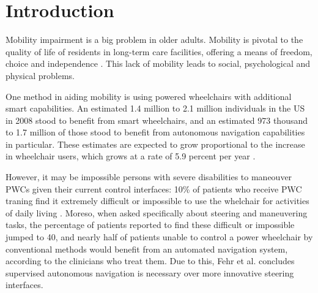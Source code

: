 

\chapter{Introduction}
\label{ch:Introduction}







Mobility impairment is a big problem in older adults. Mobility is pivotal to the
quality of life of residents in long-term care facilities, offering a means of
freedom, choice and independence \cite{bourret2002meaning}.
This lack of mobility leads to social, psychological and physical problems.

One method in aiding mobility is using powered wheelchairs with additional smart
capabilities.
An estimated 1.4 million to 2.1 million individuals in the US in 2008 stood to
benefit from smart wheelchairs, and an estimated 973 thousand to 1.7 million of
those stood to benefit from autonomous navigation capabilities in particular.
These estimates are expected to grow proportional to the increase in
wheelchair users, which grows at a rate of 5.9 percent per year
\cite{simpson2008many}.

However, it may be impossible persons with severe disabilities to maneouver PWCs
given their current control interfaces: 10\% of patients who receive PWC traning
find it extremely difficult or impossible to use the whelchair for activities of
daily living \cite{fehr2000adequacy}.
Moreso, when asked specifically about steering and maneuvering tasks, the
percentage of patients reported to find these difficult or impossible jumped to
40, and  nearly half of patients unable to control a power wheelchair by
conventional methods would benefit from an automated navigation system,
according to the clinicians who treat them. 
Due to this, Fehr et al. \cite{fehr2000adequacy} concludes supervised autonomous
navigation is necessary over more innovative steering interfaces.


